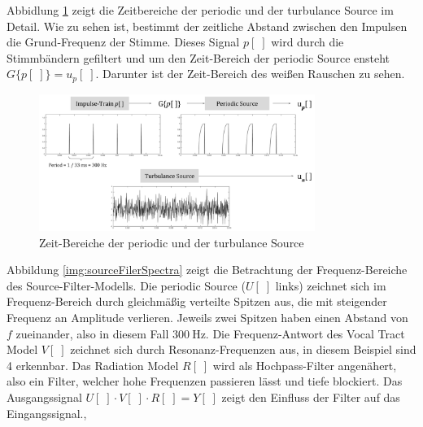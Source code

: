 Abbidlung \ref{img:glottalSource} zeigt die Zeitbereiche der periodic und der turbulance Source im Detail. Wie zu sehen ist, bestimmt der zeitliche Abstand zwischen den Impulsen die Grund-Frequenz der Stimme. Dieses Signal $p[\;]$ wird durch die Stimmbändern gefiltert und um den Zeit-Bereich der periodic Source ensteht $G\{p[\;]\} = u_p[\;]$. Darunter ist der Zeit-Bereich des weißen Rauschen zu sehen. \cite[Source]{speechAcoustics}

\begin{figure}[h]
	\centering
	\includegraphics[width=0.8\textwidth]{bilder/glottalSource.png}
	\caption{Zeit-Bereiche der periodic und der turbulance Source \cite[Source]{speechAcoustics}}
	\label{img:glottalSource}
\end{figure}	

Abbildung \ref{img:sourceFilerSpectra} zeigt die Betrachtung der Frequenz-Bereiche des Source-Filter-Modells. Die periodic Source ($U[\;]$ links) zeichnet sich im Frequenz-Bereich durch gleichmäßig verteilte Spitzen aus, die mit steigender Frequenz an Amplitude verlieren. Jeweils zwei Spitzen haben einen Abstand von $f$ zueinander, also in diesem Fall $\SI{300}{\hertz}$. Die Frequenz-Antwort des Vocal Tract Model $V[\;]$ zeichnet sich durch Resonanz-Frequenzen aus, in diesem Beispiel sind 4 erkennbar. Das Radiation Model $R[\;]$ wird als Hochpass-Filter angenähert, also ein Filter, welcher hohe Frequenzen passieren lässt und tiefe blockiert. Das Ausgangssignal $U[\;] \cdot V[\;] \cdot R[\;] = Y[\;] $ zeigt den Einfluss der Filter auf das Eingangssignal.\cite[Source estimation]{ricardo_ceps}, \cite[Vocal Tract Resonance]{speechAcoustics}

